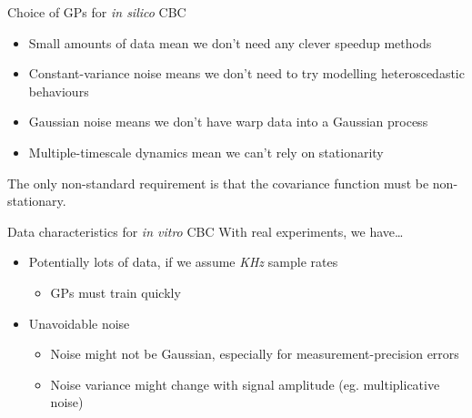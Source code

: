 \documentclass[presentation]{beamer}
\begin{document}
\begin{frame}[label={sec:org1693604}]{Choice of GPs for \emph{in silico} CBC}
\begin{itemize}
\item Small amounts of data mean we don't need any clever speedup methods
\item Constant-variance noise means we don't need to try modelling heteroscedastic behaviours
\item Gaussian noise means we don't have warp data into a Gaussian process
\item Multiple-timescale dynamics mean we can't rely on stationarity
\end{itemize}

\vfill

The only non-standard requirement is that the covariance function must be non-stationary.
\end{frame}

\begin{frame}[label={sec:org3d3ef9f}]{Data characteristics for \emph{in vitro} CBC}
With real experiments, we have\ldots{}

\vfill

\begin{itemize}
\item Potentially lots of data, if we assume \emph{KHz} sample rates
\begin{itemize}
\item GPs must train quickly
\end{itemize}
\item Unavoidable noise
\begin{itemize}
\item Noise might not be Gaussian, especially for measurement-precision errors
\item Noise variance might change with signal amplitude (eg. multiplicative noise)
\end{itemize}
\end{itemize}
\end{frame}
\end{document}

